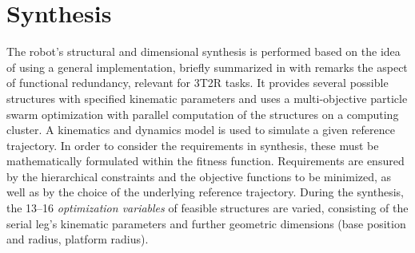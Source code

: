 \documentclass[runningheads]{llncs}
\newcommand{\TODO}[1]{\textcolor{red}{\textbf{TODO: #1}}}
\begin{document}
\section{Synthesis}\label{sec:synthesis}
The robot's structural and dimensional synthesis is performed based on the idea of \cite{Krefft2006} using a general implementation, briefly summarized in \cite{Schappler2022_ARK_3T1R} with remarks the aspect of functional redundancy, relevant for 3T2R tasks.
It provides several possible structures with specified kinematic parameters
and uses a multi-objective particle swarm optimization with parallel computation of the structures on a computing cluster. %
A kinematics and dynamics model is used to simulate a given reference trajectory. 
In order to consider the requirements in synthesis, these must be mathematically formulated within the fitness function. 
Requirements are ensured by the hierarchical constraints and the objective functions to be minimized, as well as by the choice of the underlying reference trajectory. 
During the synthesis, the 13--16 \emph{optimization variables} of feasible structures are varied, consisting of the serial leg's kinematic parameters and further geometric dimensions (base position and radius, platform radius). 
\end{document}
